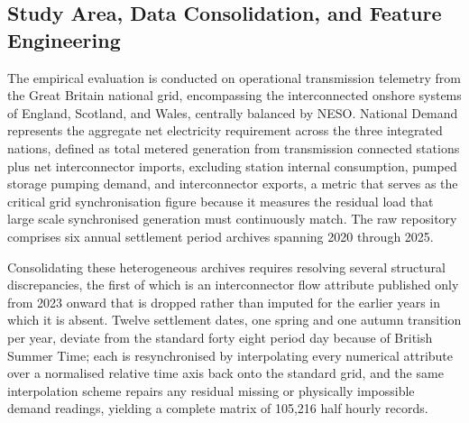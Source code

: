 \documentclass[runningheads]{llncs}
\begin{document}
\subsection{Study Area, Data Consolidation, and Feature Engineering}
\label{sec:featureeng}

The empirical evaluation is conducted on operational transmission telemetry from the Great Britain national grid, encompassing the interconnected onshore systems of England, Scotland, and Wales, centrally balanced by NESO. National Demand represents the aggregate net electricity requirement across the three integrated nations, defined as total metered generation from transmission connected stations plus net interconnector imports, excluding station internal consumption, pumped storage pumping demand, and interconnector exports, a metric that serves as the critical grid synchronisation figure because it measures the residual load that large scale synchronised generation must continuously match. The raw repository comprises six annual settlement period archives spanning 2020 through 2025.

Consolidating these heterogeneous archives requires resolving several structural discrepancies, the first of which is an interconnector flow attribute published only from 2023 onward that is dropped rather than imputed for the earlier years in which it is absent. Twelve settlement dates, one spring and one autumn transition per year, deviate from the standard forty eight period day because of British Summer Time; each is resynchronised by interpolating every numerical attribute over a normalised relative time axis back onto the standard grid, and the same interpolation scheme repairs any residual missing or physically impossible demand readings, yielding a complete matrix of 105{,}216 half hourly records.
\end{document}
